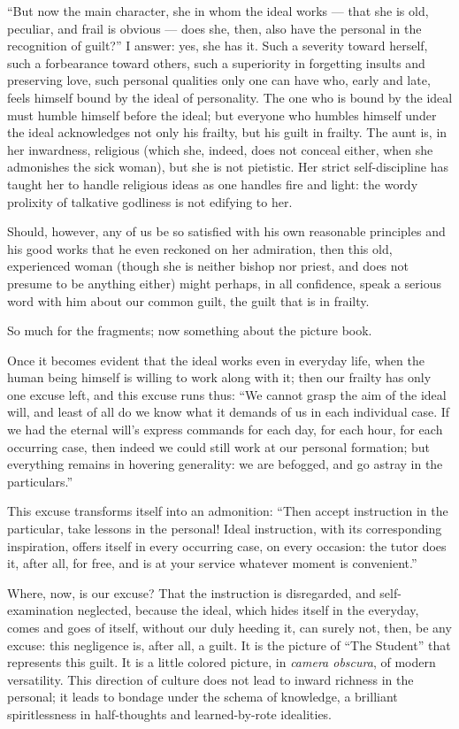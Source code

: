 \documentclass[12pt,a4paper]{book}
\begin{document}
``But now the main character, she in whom the ideal works --- that she is old, peculiar, and frail is obvious --- does she, then, also have the personal in the recognition of guilt?'' I answer: yes, she has it. Such a severity toward herself, such a forbearance toward others, such a superiority in forgetting insults and preserving love, such personal qualities only one can have who, early and late, feels himself bound by the ideal of personality. The one who is bound by the ideal must humble himself before the ideal; but everyone who humbles himself under the ideal acknowledges not only his frailty, but his guilt in frailty.
The aunt is, in her inwardness, religious (which she, indeed, does not conceal either, when she admonishes the sick woman), but she is not pietistic. Her strict self-discipline has taught her to handle religious ideas as one handles fire and light: the wordy prolixity of talkative godliness is not edifying to her.

Should, however, any of us be so satisfied with his own reasonable principles and his good works that he even reckoned on her admiration, then this old, experienced woman (though she is neither bishop nor priest, and does not presume to be anything either) might perhaps, in all confidence, speak a serious word with him about our common guilt, the guilt that is in frailty.

So much for the fragments; now something about the picture book.

Once it becomes evident that the ideal works even in everyday life, when the human being himself is willing to work along with it; then our frailty has only one excuse left, and this excuse runs thus: ``We cannot grasp the aim of the ideal will, and least of all do we know what it demands of us in each individual case. If we had the eternal will's express commands for each day, for each hour, for each occurring case, then indeed we could still work at our personal formation; but everything remains in hovering generality: we are befogged, and go astray in the particulars.''

This excuse transforms itself into an admonition: ``Then accept instruction in the particular, take lessons in the personal! Ideal instruction, with its corresponding inspiration, offers itself in every occurring case, on every occasion: the tutor does it, after all, for free, and is at your service whatever moment is convenient.''

Where, now, is our excuse? That the instruction is disregarded, and self-examination neglected, because the ideal, which hides itself in the everyday, comes and goes of itself, without our duly heeding it, can surely not, then, be any excuse: this negligence is, after all, a guilt.
It is the picture of ``The Student'' that represents this guilt. It is a little colored picture, in \textit{camera obscura}, of modern versatility. This direction of culture does not lead to inward richness in the personal; it leads to bondage under the schema of knowledge, a brilliant spiritlessness in half-thoughts and learned-by-rote idealities.
\end{document}
